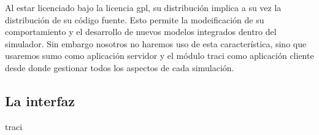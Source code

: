 Al estar licenciado bajo la licencia \gls{gpl}, su distribución implica a su vez la distribución de su código fuente. Esto permite la modeificación de su comportamiento y el desarrollo de nuevos modelos integrados dentro del simulador. Sin embargo nosotros no haremos uso de esta característica, sino que usaremos \gls{sumo} como aplicación servidor y el módulo \gls{traci} como aplicación cliente desde donde gestionar todos los aspectos de cada simulación.

\subsection{La interfaz }

\gls{traci}